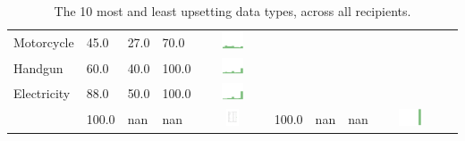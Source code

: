 \begin{table}[t]
\begin{center}
\begin{tabular}{| p{2cm} | p{1cm} | p{1cm} | p{1cm} | c | p{2cm} | p{1cm} | p{1cm} | p{1cm} | c |}
Motorcycle & 45.0 & 27.0 & 70.0 & \includegraphics[width = 2cm, height = 0.5cm]{tables/MotorcycleRisk} \\ 
Handgun & 60.0 & 40.0 & 100.0 & \includegraphics[width = 2cm, height = 0.5cm]{tables/HandgunRisk} \\ 
Electricity & 88.0 & 50.0 & 100.0 & \includegraphics[width = 2cm, height = 0.5cm]{tables/ElectricityBenefit} \\ 
 & 100.0 & nan & nan & \includegraphics[width = 2cm, height = 0.5cm]{tables/risk} & 100.0 & nan & nan & \includegraphics[width = 2cm, height = 0.5cm]{tables/ben} \\ 
\hline
\end{tabular}
\caption{The 10 most and least upsetting data types, across all recipients.}
\label{top10}
\end{center}
\end{table}
